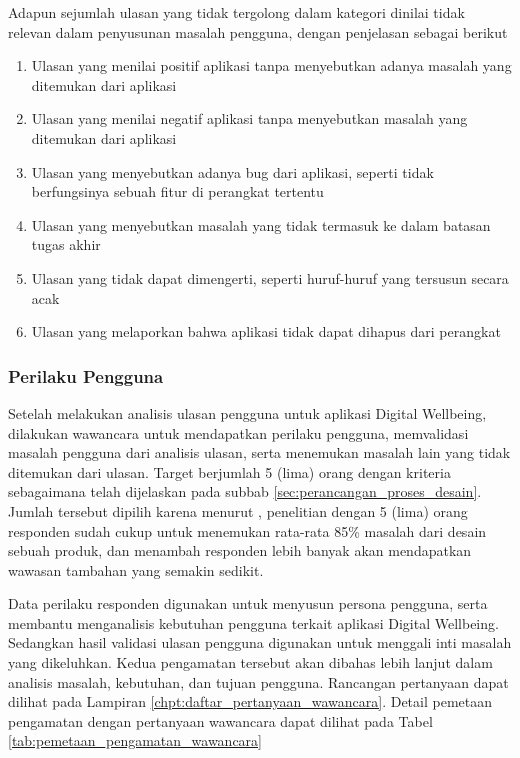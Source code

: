 Adapun sejumlah ulasan yang tidak tergolong dalam kategori dinilai tidak relevan dalam penyusunan masalah pengguna, dengan penjelasan sebagai berikut

\begin{enumerate}
  \item Ulasan yang menilai positif aplikasi tanpa menyebutkan adanya masalah yang ditemukan dari aplikasi
  \item Ulasan yang menilai negatif aplikasi tanpa menyebutkan masalah yang ditemukan dari aplikasi
  \item Ulasan yang menyebutkan adanya bug dari aplikasi, seperti tidak berfungsinya sebuah fitur di perangkat tertentu
  \item Ulasan yang menyebutkan masalah yang tidak termasuk ke dalam batasan tugas akhir
  \item Ulasan yang tidak dapat dimengerti, seperti huruf-huruf yang tersusun secara acak 
  \item Ulasan yang melaporkan bahwa aplikasi tidak dapat dihapus dari perangkat
\end{enumerate}

\subsubsection{Perilaku Pengguna}
Setelah melakukan analisis ulasan pengguna untuk aplikasi Digital Wellbeing, dilakukan wawancara untuk mendapatkan perilaku pengguna, memvalidasi masalah pengguna dari analisis ulasan, serta menemukan masalah lain yang tidak ditemukan dari ulasan. Target berjumlah 5 (lima) orang dengan kriteria sebagaimana telah dijelaskan pada subbab \ref{sec:perancangan_proses_desain}. Jumlah tersebut dipilih karena menurut \textcite{nielsenusabilityproblems}, penelitian dengan 5 (lima) orang responden sudah cukup untuk menemukan rata-rata 85\% masalah dari desain sebuah produk, dan menambah responden lebih banyak akan mendapatkan wawasan tambahan yang semakin sedikit.

 Data perilaku responden digunakan untuk menyusun persona pengguna, serta membantu menganalisis kebutuhan pengguna terkait aplikasi Digital Wellbeing. Sedangkan hasil validasi ulasan pengguna digunakan untuk  menggali inti masalah yang dikeluhkan. Kedua pengamatan tersebut akan dibahas lebih lanjut dalam analisis masalah, kebutuhan, dan tujuan pengguna. Rancangan pertanyaan dapat dilihat pada Lampiran \ref{chpt:daftar_pertanyaan_wawancara}. Detail pemetaan pengamatan dengan pertanyaan wawancara dapat dilihat pada Tabel \ref{tab:pemetaan_pengamatan_wawancara}


